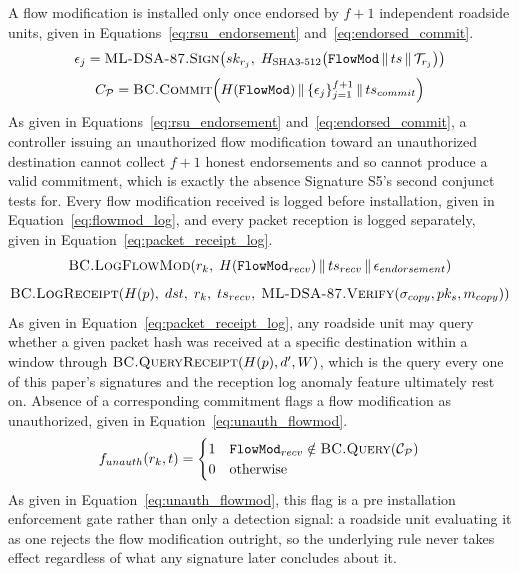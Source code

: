 \documentclass[final,5p,twocolumn]{elsarticle}
\theoremstyle{remark}
\theoremstyle{plain}
\begin{document}
A flow modification is installed only once endorsed by $f{+}1$ independent
roadside units, given in Equations~\eqref{eq:rsu_endorsement}
and~\eqref{eq:endorsed_commit}.
\begin{equation}
	\epsilon_j = \textsc{ML-DSA-87.Sign}\!\left(sk_{r_j},\; H_{\text{SHA3-512}}\!\left(\texttt{FlowMod} \,\|\, ts \,\|\, \mathcal{T}_{r_j}\right)\right)
	\label{eq:rsu_endorsement}
\end{equation}
\begin{equation}
	C_{\mathcal{P}} = \textsc{BC.Commit}\!\left(H(\texttt{FlowMod}) \,\|\, \{\epsilon_j\}_{j=1}^{f+1} \,\|\, ts_{commit}\right)
	\label{eq:endorsed_commit}
\end{equation}
As given in Equations~\eqref{eq:rsu_endorsement}
and~\eqref{eq:endorsed_commit}, a controller issuing an unauthorized flow
modification toward an unauthorized destination cannot collect $f{+}1$
honest endorsements and so cannot produce a valid commitment, which is
exactly the absence Signature S5's second conjunct tests for. Every flow
modification received is logged before installation, given in
Equation~\eqref{eq:flowmod_log}, and every packet reception is logged
separately, given in Equation~\eqref{eq:packet_receipt_log}.
\begin{equation}
	\textsc{BC.LogFlowMod}\!\left(r_k,\; H(\texttt{FlowMod}_{recv}) \,\|\, ts_{recv} \,\|\, \epsilon_{endorsement}\right)
	\label{eq:flowmod_log}
\end{equation}
\begin{equation}
	\textsc{BC.LogReceipt}\!\left(H(p),\; dst,\; r_k,\; ts_{recv},\; \textsc{ML-DSA-87.Verify}(\sigma_{copy},pk_s,m_{copy})\right)
	\label{eq:packet_receipt_log}
\end{equation}
As given in Equation~\eqref{eq:packet_receipt_log}, any roadside unit may
query whether a given packet hash was received at a specific destination
within a window through $\textsc{BC.QueryReceipt}(H(p), d', W)$, which is
the query every one of this paper's signatures and the reception log
anomaly feature ultimately rest on. Absence of a corresponding commitment
flags a flow modification as unauthorized, given in
Equation~\eqref{eq:unauth_flowmod}.
\begin{equation}
	f_{unauth}(r_k, t) =
	\begin{cases}
		1 & \texttt{FlowMod}_{recv} \notin \textsc{BC.Query}(\mathcal{C}_{\mathcal{P}}) \\
		0 & \text{otherwise}
	\end{cases}
	\label{eq:unauth_flowmod}
\end{equation}
As given in Equation~\eqref{eq:unauth_flowmod}, this flag is a
pre installation enforcement gate rather than only a detection signal: a
roadside unit evaluating it as one rejects the flow modification outright,
so the underlying rule never takes effect regardless of what any signature
later concludes about it.
\end{document}
